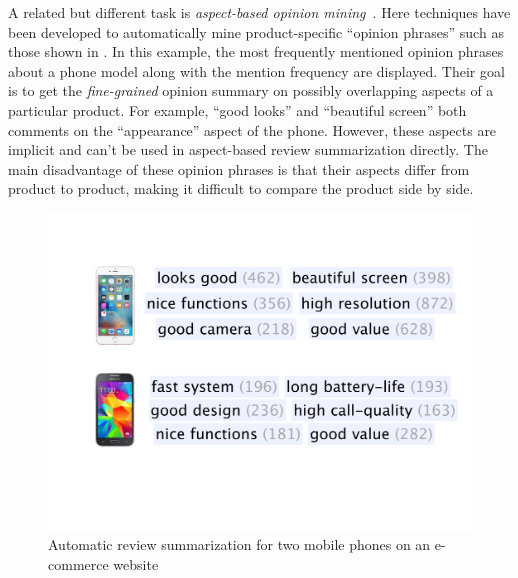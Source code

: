 A related but different task is \textit{aspect-based opinion 
mining}~\cite{su2008hidden,zeng2013classification}. 
Here techniques have been developed to automatically mine
product-specific ``opinion phrases'' such as those shown in 
.
In this example, the most frequently mentioned opinion phrases
about a phone model along with the mention frequency
are displayed. 
Their goal is to get the {\em fine-grained} opinion summary on
possibly overlapping aspects of a particular product.
For example, ``good looks'' and ``beautiful screen'' both comments
on the ``appearance'' aspect of the phone. However, these aspects
are implicit and can't be used in aspect-based review summarization
directly. The main disadvantage of these opinion phrases is that
their aspects differ from product to product, making it difficult to
compare the product side by side. 

\begin{figure}[th]
	\centering
	\includegraphics[width=0.7\columnwidth]{figures/phrases}
	\caption{Automatic review summarization for two mobile phones 
		on an e-commerce website}
	\label{fig:phrases}
\end{figure}

%


